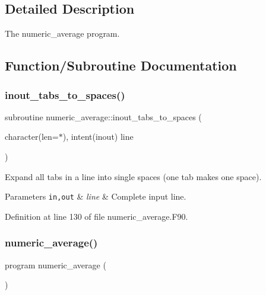 \subsection{Detailed Description}
The numeric\+\_\+average program. 



\subsection{Function/\+Subroutine Documentation}
\mbox{\label{numeric__average_8_f90_aa25afb27dd748ad53f6222cb6b79f401}} 
\subsubsection{\texorpdfstring{inout\+\_\+tabs\+\_\+to\+\_\+spaces()}{inout\_tabs\_to\_spaces()}}
{\footnotesize\ttfamily subroutine numeric\+\_\+average\+::inout\+\_\+tabs\+\_\+to\+\_\+spaces (\begin{DoxyParamCaption}\item[{character(len=$\ast$), intent(inout)}]{line }\end{DoxyParamCaption})}



Expand all tabs in a line into single spaces (one tab makes one space). 


\begin{DoxyParams}[1]{Parameters}
\mbox{\tt in,out}  & {\em line} & Complete input line. \\
\hline
\end{DoxyParams}


Definition at line 130 of file numeric\+\_\+average.\+F90.

\mbox{\label{numeric__average_8_f90_ace5b93343315ffd2ea1127474ca562de}} 
\subsubsection{\texorpdfstring{numeric\+\_\+average()}{numeric\_average()}}
{\footnotesize\ttfamily program numeric\+\_\+average (\begin{DoxyParamCaption}{ }\end{DoxyParamCaption})}




